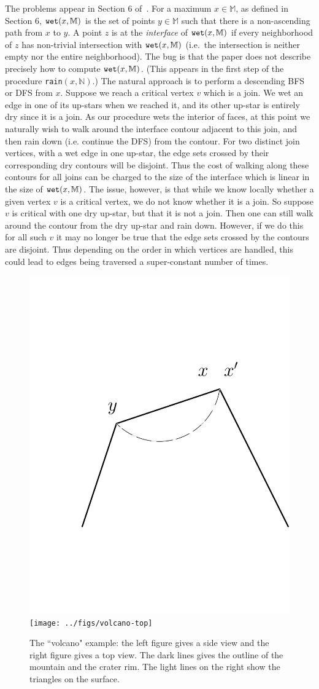 \documentclass[11pt]{article}
\theoremstyle{definition}
\newcommand{\MM}{\mathbb{M}}
\newcommand{\NN}{\mathbb{N}}
\newcommand{\wet}{{\tt wet}}
\begin{document}
The problems appear in Section 6 of~\cite{rs-17}. 
For a maximum $x\in \MM$, as defined in Section 6, $\wet(x,\MM)$ is the set of points $y \in \MM$ such that there is a non-ascending path from $x$ to $y$. A point $z$ is at the \emph{interface} of $\wet(x,\MM)$ if every neighborhood of $z$ has non-trivial intersection with $\wet(x,\MM)$ (i.e.\ the intersection is neither empty nor the entire neighborhood). 
The bug is that the paper does not describe precisely how to compute $\wet(x,\MM)$. (This appears in the first step of the procedure {\tt rain}$(x,\NN)$.) The natural approach is to perform a descending BFS or DFS from $x$. Suppose we reach a critical vertex $v$ which is a join. We wet an edge in one of its up-stars when we reached it, and its other up-star is entirely dry since it is a join. As our procedure wets the interior of faces, at this point we naturally wish to walk around the interface contour adjacent to this join, and then rain down (i.e. continue the DFS) from the contour. 
%
For two distinct join vertices, with a wet edge in one up-star, the edge sets crossed by their corresponding dry contours will be disjoint.  
%
Thus the cost of walking along these contours for all joins can be charged to the size of the interface which is linear in the size of $\wet(x,\MM)$. 
%
The issue, however, is that while we know locally whether a given vertex $v$ is a critical vertex, we do not know whether it is a join.
%
So suppose $v$ is critical with one dry up-star, but that it is not a join. Then one can still walk around the contour from the dry up-star and rain down. However, if we do this for all such $v$ it may no longer be true that the edge sets crossed by the contours are disjoint. Thus depending on the order in which vertices are handled, this could lead to edges being traversed a super-constant number of times. 


\begin{figure}[h]\centering
    \includegraphics[width=0.45\linewidth]{../figs/volcano}
    \hspace{0.5in}
    \texttt{[image: ../figs/volcano-top]}
    \caption{The ``volcano" example: the left figure gives a side view and the right figure
    gives a top view. The dark lines gives the outline of the mountain and the crater rim. The light
    lines on the right show the triangles on the surface.}
    \label{fig:volcano}
\end{figure}
\end{document}
